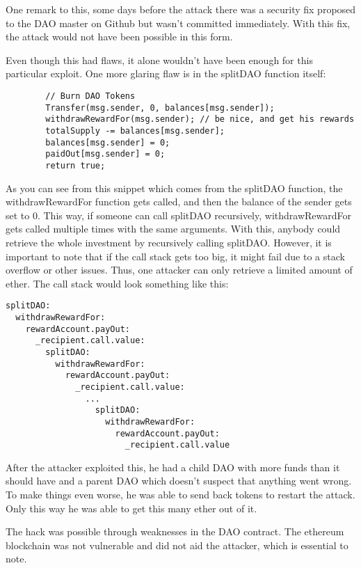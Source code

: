 \documentclass[a4paper, 11pt]{scrartcl}
\begin{document}
One remark to this, some days before the attack there was a security fix proposed to the DAO master on Github but wasn't committed immediately. With this fix, the attack would not have been possible in this form. \cite{securityFixPayout}

Even though this had flaws, it alone wouldn't have been enough for this particular exploit. One more glaring flaw is in the splitDAO function itself: \cite{deconstructingDaoAttack}

\begin{verbatim}
        // Burn DAO Tokens
        Transfer(msg.sender, 0, balances[msg.sender]);
        withdrawRewardFor(msg.sender); // be nice, and get his rewards
        totalSupply -= balances[msg.sender];
        balances[msg.sender] = 0;
        paidOut[msg.sender] = 0;
        return true;
\end{verbatim}

As you can see from this snippet which comes from the splitDAO function, the withdrawRewardFor function gets called, and then the balance of the sender gets set to 0. This way, if someone can call splitDAO recursively, withdrawRewardFor gets called multiple times with the same arguments. With this, anybody could retrieve the whole investment by recursively calling splitDAO. However, it is important to note that if the call stack gets too big, it might fail due to a stack overflow or other issues. Thus, one attacker can only retrieve a limited amount of ether. The call stack would look something like this: \cite{deconstructingDaoAttack}

\begin{verbatim}
splitDAO:
  withdrawRewardFor:
    rewardAccount.payOut:
      _recipient.call.value:
        splitDAO:
          withdrawRewardFor:
            rewardAccount.payOut:
              _recipient.call.value:
                ...  
                  splitDAO:
                    withdrawRewardFor:
                      rewardAccount.payOut:
                        _recipient.call.value
\end{verbatim}

After the attacker exploited this, he had a child DAO with more funds than it should have and a parent DAO which doesn't suspect that anything went wrong. To make things even worse, he was able to send back tokens to restart the attack. Only this way he was able to get this many ether out of it. \cite{deconstructingDaoAttack}

The hack was possible through weaknesses in the DAO contract. The ethereum blockchain was not vulnerable and did not aid the attacker, which is essential to note. 
\end{document}
